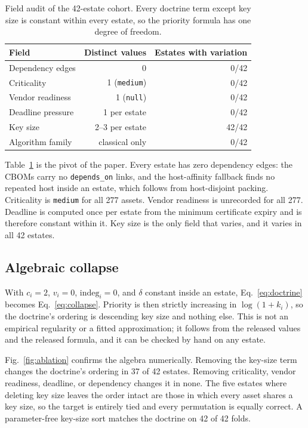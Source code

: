 \documentclass[journal,10pt]{IEEEtran}
\begin{document}
\begin{table}[t]
\centering
\caption{Field audit of the 42-estate cohort. Every doctrine term except key size is constant
within every estate, so the priority formula has one degree of freedom.}
\label{tab:audit}
\footnotesize
\begin{tabular}{@{}lrr@{}}
\toprule
Field & Distinct values & Estates with variation \\
\midrule
Dependency edges & 0 & 0/42 \\
Criticality & 1 (\texttt{medium}) & 0/42 \\
Vendor readiness & 1 (\texttt{null}) & 0/42 \\
Deadline pressure & 1 per estate & 0/42 \\
Key size & 2--3 per estate & 42/42 \\
Algorithm family & classical only & 0/42 \\
\bottomrule
\end{tabular}
\end{table}

Table~\ref{tab:audit} is the pivot of the paper. Every estate has zero dependency edges: the CBOMs
carry no \texttt{depends\_on} links, and the host-affinity fallback finds no repeated host inside
an estate, which follows from host-disjoint packing. Criticality is \texttt{medium} for all 277
assets. Vendor readiness is unrecorded for all 277. Deadline is computed once per estate from the
minimum certificate expiry and is therefore constant within it. Key size is the only field that
varies, and it varies in all 42 estates.

\subsection{Algebraic collapse}

With $c_i=2$, $v_i=0$, $\mathrm{indeg}_i=0$, and $\delta$ constant inside an estate,
Eq.~\eqref{eq:doctrine} becomes Eq.~\eqref{eq:collapse}. Priority is then strictly increasing in
$\log(1+k_i)$, so the doctrine's ordering is descending key size and nothing else. This is not an
empirical regularity or a fitted approximation; it follows from the released values and the
released formula, and it can be checked by hand on any estate.

Fig.~\ref{fig:ablation} confirms the algebra numerically. Removing the key-size term changes the
doctrine's ordering in 37 of 42 estates. Removing criticality, vendor readiness, deadline, or
dependency changes it in none. The five estates where deleting key size leaves the order intact are
those in which every asset shares a key size, so the target is entirely tied and every permutation
is equally correct. A parameter-free key-size sort matches the doctrine on 42 of 42 folds.
\end{document}
